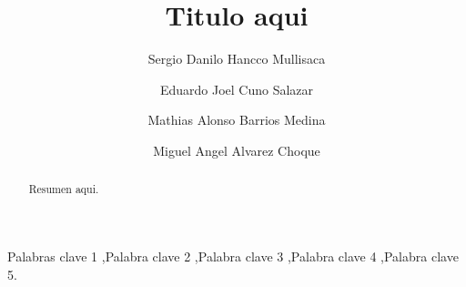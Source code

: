\documentclass[5p]{elsarticle}
\begin{document}
\begin{frontmatter}







\title{Titulo aqui}



\author[First]{Sergio Danilo Hancco Mullisaca}

\author[First]{Eduardo Joel Cuno Salazar}

\author[First]{Mathias Alonso Barrios Medina}

\author[First]{Miguel Angel Alvarez Choque}


\address[First]{Universidad Nacional de San Agust{\'i}n, Arequipa, Per{\'u}.}

\begin{abstract}
Resumen aqui.
\end{abstract}

\begin{keyword}


Palabras clave 1 \sep Palabra clave 2 \sep Palabra clave 3 \sep Palabra clave 4 \sep Palabra clave 5.
\end{keyword}


\end{frontmatter}
\end{document}
